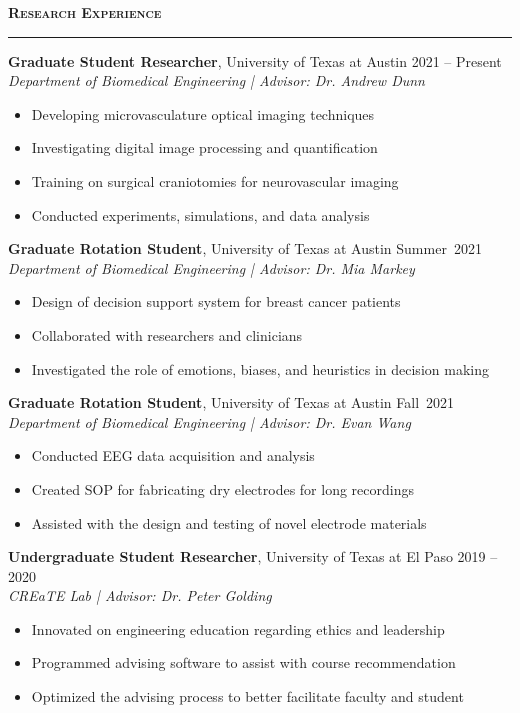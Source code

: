 \documentclass[11pt]{article}
\newcommand{\sectionheading}[1]{%
  \vspace{1.2ex}%
  {\large\bfseries\textsc{#1}}\par\vspace{0.4ex}%
  \color{gray}\rule{\linewidth}{0.5pt}\color{black}\vspace{0.6ex}%
}
\begin{document}
\sectionheading{Research Experience}

\textbf{Graduate Student Researcher}, University of Texas at Austin \hfill 2021 -- Present\\
\textit{Department of Biomedical Engineering \;|\; Advisor: Dr. Andrew Dunn}
\begin{itemize}
  \item Developing microvasculature optical imaging techniques
  \item Investigating digital image processing and quantification
  \item Training on surgical craniotomies for neurovascular imaging
  \item Conducted experiments, simulations, and data analysis
\end{itemize}

\textbf{Graduate Rotation Student}, University of Texas at Austin \hfill Summer~2021\\
\textit{Department of Biomedical Engineering \;|\; Advisor: Dr. Mia Markey}
\begin{itemize}
  \item Design of decision support system for breast cancer patients
  \item Collaborated with researchers and clinicians
  \item Investigated the role of emotions, biases, and heuristics in decision making
\end{itemize}

\textbf{Graduate Rotation Student}, University of Texas at Austin \hfill Fall~2021\\
\textit{Department of Biomedical Engineering \;|\; Advisor: Dr. Evan Wang}
\begin{itemize}
  \item Conducted EEG data acquisition and analysis
  \item Created SOP for fabricating dry electrodes for long recordings
  \item Assisted with the design and testing of novel electrode materials
\end{itemize}

\textbf{Undergraduate Student Researcher}, University of Texas at El Paso \hfill 2019 -- 2020\\
\textit{CREaTE Lab \;|\; Advisor: Dr. Peter Golding}
\begin{itemize}
  \item Innovated on engineering education regarding ethics and leadership
  \item Programmed advising software to assist with course recommendation
  \item Optimized the advising process to better facilitate faculty and student
\end{itemize}
\end{document}
